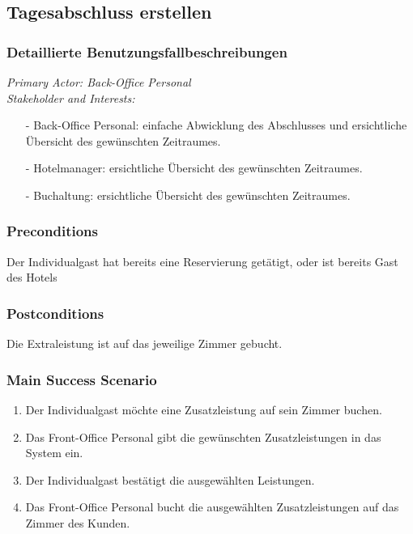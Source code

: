 \documentclass[./detailed_overview_usecases.tex]{subfiles}
\begin{document}
    \subsection{Tagesabschluss erstellen}
    \subsubsection{Detaillierte Benutzungsfallbeschreibungen}
    \textit{Primary Actor: Back-Office Personal}
    \\
    \textit{Stakeholder and Interests:}
    \begin{itemize}
        \item[-] Back-Office Personal: einfache Abwicklung des Abschlusses und ersichtliche Übersicht des gewünschten Zeitraumes.
        \item[-] Hotelmanager: ersichtliche Übersicht des gewünschten Zeitraumes.
        \item[-] Buchaltung: ersichtliche Übersicht des gewünschten Zeitraumes.
    \end{itemize}

    \subsubsection*{Preconditions}
    Der Individualgast hat bereits eine Reservierung getätigt, oder ist bereits Gast des Hotels
    \subsubsection*{Postconditions}
    Die Extraleistung ist auf das jeweilige Zimmer gebucht.

    \subsubsection*{Main Success Scenario}
    \begin{enumerate}
        \item Der Individualgast möchte eine Zusatzleistung auf sein Zimmer buchen.
        \item Das Front-Office Personal gibt die gewünschten Zusatzleistungen in das System ein.
        \item Der Individualgast bestätigt die ausgewählten Leistungen.
        \item Das Front-Office Personal bucht die ausgewählten Zusatzleistungen auf das Zimmer des Kunden.
    \end{enumerate}
\end{document}
